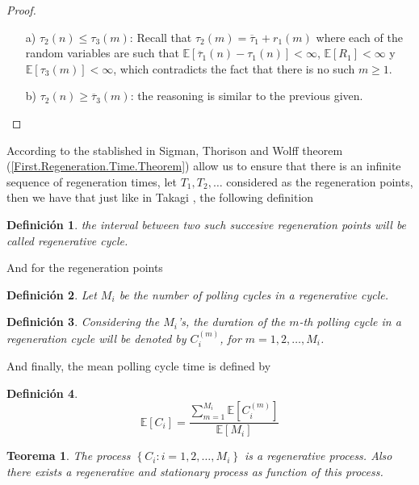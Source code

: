 \documentclass{article}
\newtheorem{Def}{Definición}
\newtheorem{Teo}{Teorema}
\newcommand{\esp}{\mathbb{E}}
\begin{document}
\begin{proof}
\begin{itemize}
\item[a)] $\tau_{2}\left(n\right)\leq\tau_{3}\left(m\right)$: Recall that $\tau_{2}\left(m\right)=\overline{\tau}_{1}+r_{1}\left(m\right)$ 
where each of the random variables are such that $\esp\left[\overline{\tau}_{1}\left(n\right)-\tau_{1}\left(n\right)\right]<\infty$, $\esp\left[R_{1}\right]<\infty$ y $\esp\left[\tau_{3}\left(m\right)\right]<\infty$, which contradicts the fact that there is no such $m\geq1$.

\item[b)] $\tau_{2}\left(n\right)\geq\overline{\tau}_{3}\left(m\right)$: the reasoning is similar to the previous given.

\end{itemize}

\end{proof}


According to the stablished in Sigman, Thorison and Wolff \cite{Sigman2} theorem (\ref{First.Regeneration.Time.Theorem}) allow us to ensure that there is an infinite sequence of regeneration times, let $T_{1},T_{2},\ldots$ considered as the regeneration points, then we have that just like in Takagi \cite{Takagi}, the following definition

\begin{Def}
the interval between two such succesive regeneration points will be called regenerative cycle.
\end{Def}

And for the regeneration points 

\begin{Def}
Let $M_{i}$ be the number of polling cycles in a regenerative cycle.
\end{Def}

\begin{Def}
Considering the $M_{i}$'s, the duration of the $m$-th polling cycle in a regeneration cycle will be denoted by $C_{i}^{(m)}$, for $m=1,2,\ldots,M_{i}$.
\end{Def}

And finally, the mean polling cycle time is defined by

\begin{Def}
\begin{equation}
\esp\left[C_{i}\right]=\frac{\sum_{m=1}^{M_{i}}\esp\left[C_{i}^{(m)}\right]}{\esp\left[M_{i}\right]}
\end{equation}
\end{Def}

\begin{Teo}
The process $\left\{C_{i}:i=1,2,\ldots,M_{i}\right\}$ is a regenerative process. Also there exists a regenerative and stationary process as function of this process.
\end{Teo}
\end{document}
